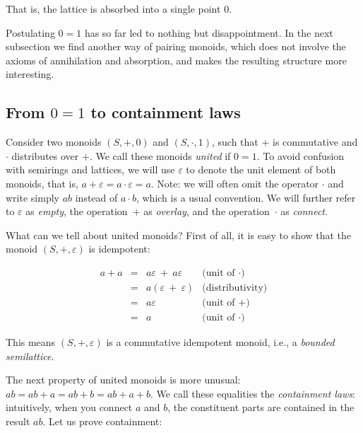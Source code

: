 \documentclass[english,submission]{programming}
\begin{document}
\noindent
That is, the lattice is absorbed into a single point $0$.

Postulating $0 = 1$ has so far led to nothing but disappointment. In the
next subsection we find another way of pairing monoids, which does not involve
the axioms of annihilation and absorption, and makes the resulting structure
more interesting.

\subsection{From $0=1$ to containment laws}

Consider two monoids $(S, +, 0)$ and $(S, \cdot, 1)$, such that $+$ is
commutative and $\cdot$ distributes over $+$. We call these monoids
\emph{united} if $0 = 1$. To avoid confusion with semirings and lattices, we
will use $\varepsilon$ to denote the unit element of both monoids, that is,
$a + \varepsilon = a \cdot \varepsilon = a$. Note: we will often omit the
operator $\cdot$ and write simply $ab$ instead of $a \cdot b$, which is a usual
convention. We will further refer to $\varepsilon$ as \emph{empty}, the
operation~$+$ as \emph{overlay}, and the operation~$\cdot$ as \emph{connect}.

\newpage
\noindent
What can we tell about united monoids? First of all, it is easy to show that the
monoid $(S, +, \varepsilon)$ is idempotent:

\vspace{-5mm}
\begin{equation*}
\begin{array}{rcll}
a + a & = & a\varepsilon\ +\ a\varepsilon & \text{(unit of $\cdot$)}\\
 & = & a(\varepsilon\ +\ \varepsilon) & \text{(distributivity)}\\
 & = & a\varepsilon & \text{(unit of $+$)}\\
 & = & a & \text{(unit of $\cdot$)}
\end{array}
\end{equation*}
\vspace{-3mm}

\noindent
This means $(S, +, \varepsilon)$ is a commutative idempotent monoid, i.e.,
a \emph{bounded semilattice}.

The next property of united monoids is more unusual:
$ab = ab + a = ab + b = ab + a + b$. We call these equalities the \emph{containment laws}:
intuitively, when you connect $a$ and $b$, the constituent parts are contained
in the result $ab$. Let us prove containment:
\end{document}
